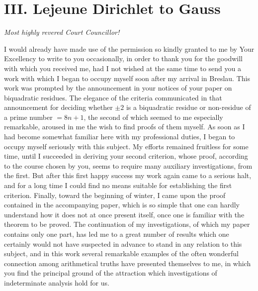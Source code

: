 \documentclass[11pt]{article}
\begin{document}
\section*{III. Lejeune Dirichlet to Gauss}
\begin{center}\emph{Most highly revered Court Councillor!}\end{center}

I would already have made use of the permission so kindly granted to me by Your Excellency to write to you occasionally, in order to thank you for the goodwill with which you received me, had I not wished at the same time to send you a work with which I began to occupy myself soon after my arrival in Breslau. This work was prompted by the announcement in your notices of your paper on biquadratic residues. The elegance of the criteria communicated in that announcement for deciding whether $\pm2$ is a biquadratic residue or non-residue of a prime number $=8n+1$, the second of which seemed to me especially remarkable, aroused in me the wish to find proofs of them myself. As soon as I had become somewhat familiar here with my professional duties, I began to occupy myself seriously with this subject. My efforts remained fruitless for some time, until I succeeded in deriving your second criterion, whose proof, according to the course chosen by you, seems to require many auxiliary investigations, from the first. But after this first happy success my work again came to a serious halt, and for a long time I could find no means suitable for establishing the first criterion. Finally, toward the beginning of winter, I came upon the proof contained in the accompanying paper, which is so simple that one can hardly understand how it does not at once present itself, once one is familiar with the theorem to be proved. The continuation of my investigations, of which my paper contains only one part, has led me to a great number of results which one certainly would not have suspected in advance to stand in any relation to this subject, and in this work several remarkable examples of the often wonderful connection among arithmetical truths have presented themselves to me, in which you find the principal ground of the attraction which investigations of indeterminate analysis hold for us.
\end{document}
